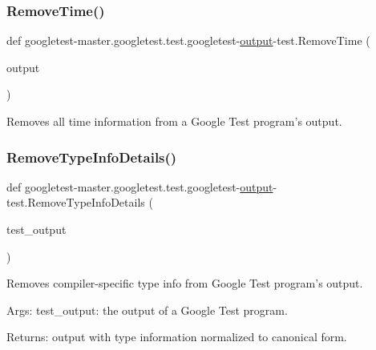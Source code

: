 \subsubsection{\texorpdfstring{RemoveTime()}{RemoveTime()}}
{\footnotesize\ttfamily def googletest-\/master.\+googletest.\+test.\+googletest-\/\mbox{\hyperlink{namespacegoogletest-master_1_1googletest_1_1test_1_1googletest-output-test_a734f0a5bd94ba038f4350763c6977129}{output}}-\/test.\+Remove\+Time (\begin{DoxyParamCaption}\item[{}]{output }\end{DoxyParamCaption})}

\begin{DoxyVerb}Removes all time information from a Google Test program's output.\end{DoxyVerb}
 \mbox{\label{namespacegoogletest-master_1_1googletest_1_1test_1_1googletest-output-test_a67f6bfc71ed1130bb733ac13911f772a}} 
\subsubsection{\texorpdfstring{RemoveTypeInfoDetails()}{RemoveTypeInfoDetails()}}
{\footnotesize\ttfamily def googletest-\/master.\+googletest.\+test.\+googletest-\/\mbox{\hyperlink{namespacegoogletest-master_1_1googletest_1_1test_1_1googletest-output-test_a734f0a5bd94ba038f4350763c6977129}{output}}-\/test.\+Remove\+Type\+Info\+Details (\begin{DoxyParamCaption}\item[{}]{test\+\_\+output }\end{DoxyParamCaption})}

\begin{DoxyVerb}Removes compiler-specific type info from Google Test program's output.

Args:
     test_output:  the output of a Google Test program.

Returns:
     output with type information normalized to canonical form.
\end{DoxyVerb}
 \mbox{\label{namespacegoogletest-master_1_1googletest_1_1test_1_1googletest-output-test_a99ee2f28903ba3d04da61284954555ba}} 
